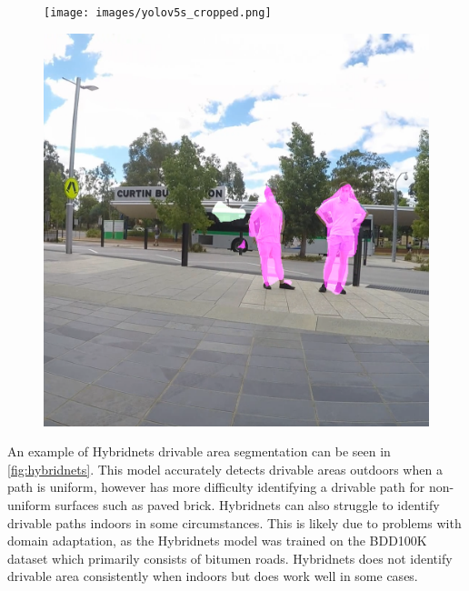 \begin{figure}[b]
    \centering
    \begin{minipage}[b]{.45\textwidth}
        \centering
        \captionsetup{width=.8\textwidth}
        \texttt{[image: images/yolov5s\_cropped.png]}
        \label{fig:yolov5s}
    \end{minipage}%
    \quad
    \begin{minipage}[b]{.45\textwidth}
        \centering
        \captionsetup{width=.8\textwidth}
        \includegraphics[width=\linewidth]{images/deeplab_cropped.png}
        \label{fig:deeplab}
    \end{minipage}
\end{figure}

An example of Hybridnets drivable area segmentation can be seen in \cref{fig:hybridnets}.
This model accurately detects drivable areas outdoors when a path is uniform, however
has more difficulty identifying a drivable path for non-uniform surfaces such as paved brick.
Hybridnets can also struggle to identify drivable paths indoors in some circumstances.
This is likely due to problems with domain adaptation, as the Hybridnets model was trained on the
BDD100K dataset which primarily consists of bitumen roads.
Hybridnets does not identify drivable area consistently when indoors
but does work well in some cases.

